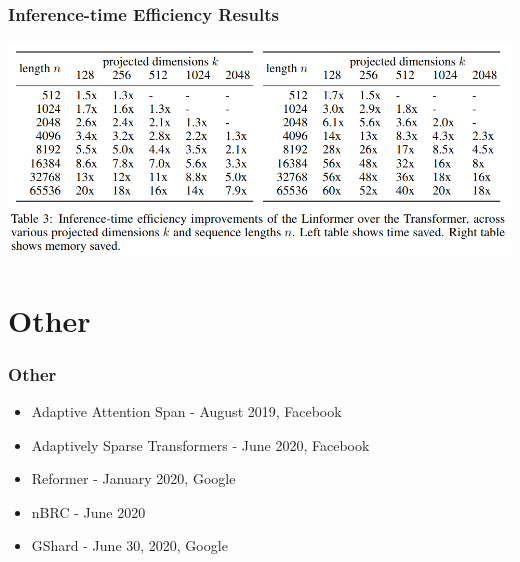 \documentclass{beamer}
\begin{document}
\begin{frame}
    \frametitle{Inference-time Efficiency Results}
    \begin{center}
        \includegraphics[scale=0.33]{img/linformer_compare.png}
    \end{center}
\end{frame}



\section{Other}
\begin{frame}
    \frametitle{Other}
    \begin{itemize}
        \item Adaptive Attention Span \cite{adaptive_span} - August 2019, Facebook
        \item Adaptively Sparse Transformers \cite{adaptively_sparse_transformers} - June 2020, Facebook
        \item Reformer \cite{reformer} - January 2020, Google
        \item nBRC \cite{n_brc} - June 2020
        \item GShard \cite{gshard}- June 30, 2020, Google
    \end{itemize}
\end{frame}


\end{document}
